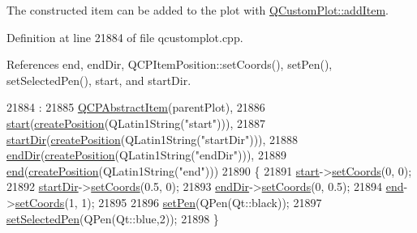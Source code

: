 The constructed item can be added to the plot with \hyperlink{class_q_custom_plot_aa500620379262321685cb7a7674cbd2a}{Q\+Custom\+Plot\+::add\+Item}. 

Definition at line 21884 of file qcustomplot.\+cpp.



References end, end\+Dir, Q\+C\+P\+Item\+Position\+::set\+Coords(), set\+Pen(), set\+Selected\+Pen(), start, and start\+Dir.


\begin{DoxyCode}
21884                                                   :
21885   \hyperlink{class_q_c_p_abstract_item_a9922507d8b4503a1fe1ed0b1030e23b6}{QCPAbstractItem}(parentPlot),
21886   \hyperlink{class_q_c_p_item_curve_a20c3b5ea31c33764f4f30c2ec7ae518b}{start}(\hyperlink{class_q_c_p_abstract_item_a75036d39c4d4e2e1a7dd145fff915d32}{createPosition}(QLatin1String(\textcolor{stringliteral}{"start"}))),
21887   \hyperlink{class_q_c_p_item_curve_aa124bf66c09cc51c627fb49db8bf8a7b}{startDir}(\hyperlink{class_q_c_p_abstract_item_a75036d39c4d4e2e1a7dd145fff915d32}{createPosition}(QLatin1String(\textcolor{stringliteral}{"startDir"}))),
21888   \hyperlink{class_q_c_p_item_curve_a28181a9dee9cc3c3da83a883221bd2d0}{endDir}(\hyperlink{class_q_c_p_abstract_item_a75036d39c4d4e2e1a7dd145fff915d32}{createPosition}(QLatin1String(\textcolor{stringliteral}{"endDir"}))),
21889   \hyperlink{class_q_c_p_item_curve_a24ecbb195b32a08b42b61c2cf08a1b4d}{end}(\hyperlink{class_q_c_p_abstract_item_a75036d39c4d4e2e1a7dd145fff915d32}{createPosition}(QLatin1String(\textcolor{stringliteral}{"end"})))
21890 \{
21891   \hyperlink{class_q_c_p_item_curve_a20c3b5ea31c33764f4f30c2ec7ae518b}{start}->\hyperlink{class_q_c_p_item_position_aa988ba4e87ab684c9021017dcaba945f}{setCoords}(0, 0);
21892   \hyperlink{class_q_c_p_item_curve_aa124bf66c09cc51c627fb49db8bf8a7b}{startDir}->\hyperlink{class_q_c_p_item_position_aa988ba4e87ab684c9021017dcaba945f}{setCoords}(0.5, 0);
21893   \hyperlink{class_q_c_p_item_curve_a28181a9dee9cc3c3da83a883221bd2d0}{endDir}->\hyperlink{class_q_c_p_item_position_aa988ba4e87ab684c9021017dcaba945f}{setCoords}(0, 0.5);
21894   \hyperlink{class_q_c_p_item_curve_a24ecbb195b32a08b42b61c2cf08a1b4d}{end}->\hyperlink{class_q_c_p_item_position_aa988ba4e87ab684c9021017dcaba945f}{setCoords}(1, 1);
21895   
21896   \hyperlink{class_q_c_p_item_curve_a034be908440aec785c34b92843461221}{setPen}(QPen(Qt::black));
21897   \hyperlink{class_q_c_p_item_curve_a375b917669f868c5a106bf2f1ab7c26d}{setSelectedPen}(QPen(Qt::blue,2));
21898 \}
\end{DoxyCode}


